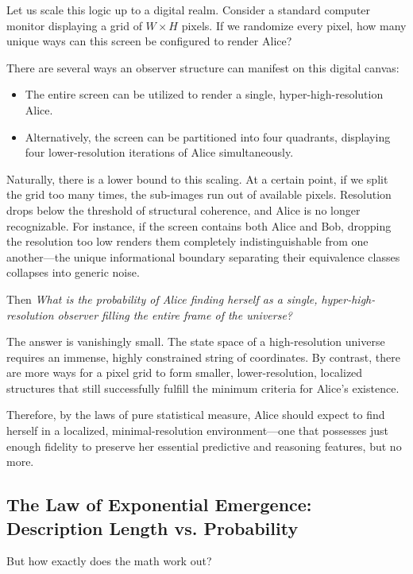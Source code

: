 Let us scale this logic up to a digital realm.
Consider a standard computer monitor displaying a grid of $W \times H$ pixels.
If we randomize every pixel, how many unique ways can this screen be configured to render Alice?

There are several ways an observer structure can manifest on this digital canvas:
\begin{itemize}
    \item The entire screen can be utilized to render a single, hyper-high-resolution Alice.
    \item Alternatively, the screen can be partitioned into four quadrants, displaying four lower-resolution iterations of Alice simultaneously.
\end{itemize}

Naturally, there is a lower bound to this scaling.
At a certain point, if we split the grid too many times, the sub-images run out of available pixels.
Resolution drops below the threshold of structural coherence, and Alice is no longer recognizable.
For instance, if the screen contains both Alice and Bob, dropping the resolution too low renders them completely indistinguishable from one another—the unique informational boundary separating their equivalence classes collapses into generic noise.

Then \emph{What is the probability of Alice finding herself as a single, hyper-high-resolution observer filling the entire frame of the universe?}

The answer is vanishingly small. The state space of a high-resolution universe requires an immense, highly constrained string of coordinates.
By contrast, there are more ways for a pixel grid to form smaller, lower-resolution, localized structures that still successfully fulfill the minimum criteria for Alice's existence. 

Therefore, by the laws of pure statistical measure,
Alice should expect to find herself in a localized, minimal-resolution environment—one that possesses just enough fidelity to preserve her essential predictive and reasoning features, but no more. 



\subsection{The Law of Exponential Emergence: Description Length vs. Probability}

But how exactly does the math work out? 

